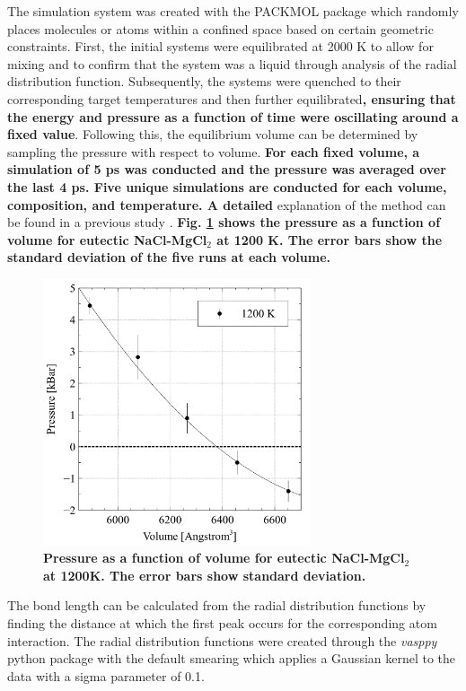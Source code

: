 \documentclass[review]{elsarticle}
\providecommand{\DIFaddtex}[1]{{\bf #1}} %
\providecommand{\DIFdeltex}[1]{} %
\providecommand{\DIFaddbegin}{\protect\color{blue}} %
\providecommand{\DIFaddend}{\protect\color{black}} %
\providecommand{\DIFdelbegin}{\protect\color{red}} %
\providecommand{\DIFdelend}{\protect\color{black}} %
\providecommand{\DIFaddFL}[1]{\DIFadd{#1}} %
\providecommand{\DIFadd}[1]{\texorpdfstring{\DIFaddtex{#1}}{#1}} %
\providecommand{\DIFdel}[1]{\texorpdfstring{\DIFdeltex{#1}}{}} %
\newcommand{\DIFscaledelfig}{0.5}
\newlength{\DIFdelgraphicswidth} %
\newlength{\DIFdelgraphicsheight} %
\newcommand{\DIFaddincludegraphics}[2][]{{\color{blue}\fbox{\DIFOincludegraphics[#1]{#2}}}} %
\newcommand{\DIFdelincludegraphics}[2][]{%
\sbox{\DIFdelgraphicsbox}{\DIFOincludegraphics[#1]{#2}}%
\settoboxwidth{\DIFdelgraphicswidth}{\DIFdelgraphicsbox} %
\settoboxtotalheight{\DIFdelgraphicsheight}{\DIFdelgraphicsbox} %
\scalebox{\DIFscaledelfig}{%
\parbox[b]{\DIFdelgraphicswidth}{\usebox{\DIFdelgraphicsbox}\\[-\baselineskip] \rule{\DIFdelgraphicswidth}{0em}}\llap{\resizebox{\DIFdelgraphicswidth}{\DIFdelgraphicsheight}{%
\setlength{\unitlength}{\DIFdelgraphicswidth}%
\begin{picture}(1,1)%
\thicklines\linethickness{2pt} %
{\color[rgb]{1,0,0}\put(0,0){\framebox(1,1){}}}%
{\color[rgb]{1,0,0}\put(0,0){\line( 1,1){1}}}%
{\color[rgb]{1,0,0}\put(0,1){\line(1,-1){1}}}%
\end{picture}%
}\hspace*{3pt}}} %
} %
\DeclareRobustCommand{\DIFaddbegin}{\DIFOaddbegin \let\includegraphics\DIFaddincludegraphics} %
\DeclareRobustCommand{\DIFaddend}{\DIFOaddend \let\includegraphics\DIFOincludegraphics} %
\DeclareRobustCommand{\DIFdelbegin}{\DIFOdelbegin \let\includegraphics\DIFdelincludegraphics} %
\DeclareRobustCommand{\DIFdelend}{\DIFOaddend \let\includegraphics\DIFOincludegraphics} %
\begin{document}
The simulation system was created with the PACKMOL package \cite{martinez2009} which randomly places molecules or atoms within a confined space based on certain geometric constraints. First, the initial systems were equilibrated at 2000 K to allow for mixing and to confirm that the system was a liquid through analysis of the radial distribution function. Subsequently, the systems were quenched to their corresponding target temperatures and then further equilibrated\DIFaddbegin \DIFadd{, ensuring that the energy and pressure as a function of time were oscillating around a fixed value}\DIFaddend . Following this, the equilibrium volume can be determined by sampling the pressure with respect to volume. \DIFdelbegin \DIFdel{Detailed }\DIFdelend \DIFaddbegin \DIFadd{For each fixed volume, a simulation of 5 ps was conducted and the pressure was averaged over the last 4 ps. Five unique simulations are conducted for each volume, composition, and temperature. A detailed }\DIFaddend explanation of the method can be found in a previous study \cite{Duemmler2021}. \DIFaddbegin \DIFadd{Fig. \ref{fig:PVV} shows the pressure as a function of volume for eutectic NaCl-MgCl$_2$ at 1200 K. The error bars show the standard deviation of the five runs at each volume.
}\DIFaddend 

\DIFaddbegin \begin{figure}[h]
 \centering
 \includegraphics[width=0.7\textwidth]{PressureVsVolume.jpg} 
 \caption{\DIFaddFL{Pressure as a function of volume for eutectic NaCl-MgCl$_2$ at 1200K. The error bars show standard deviation.}}
 \label{fig:PVV}
\end{figure} 

\DIFaddend The bond length can be calculated from the radial distribution functions by finding the distance at which the first peak occurs for the corresponding atom interaction. The radial distribution functions were created through the \textit{vasppy} python package with the default smearing which applies a Gaussian kernel to the data with a sigma parameter of 0.1. 
\DIFaddbegin 
\end{document}
